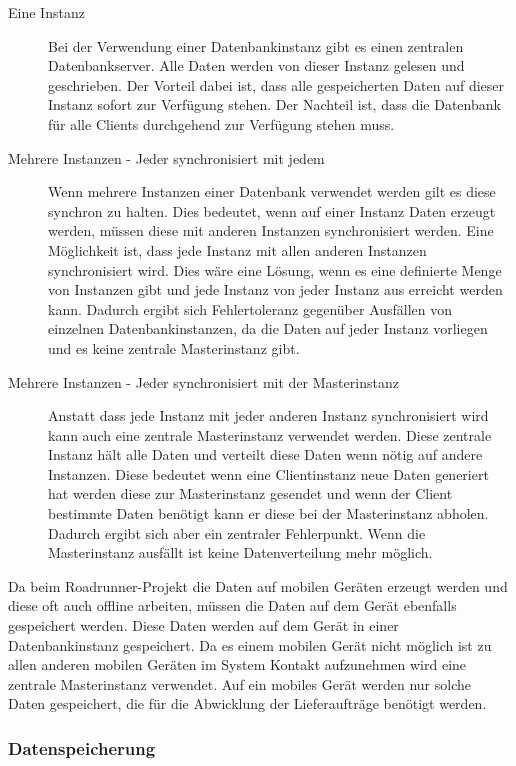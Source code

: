 \begin{appendix}
	\begin{description}
		\item[Eine Instanz] Bei der Verwendung einer Datenbankinstanz gibt es einen zentralen Datenbankserver. Alle Daten werden von dieser Instanz gelesen und geschrieben. Der Vorteil dabei ist, dass alle gespeicherten Daten auf dieser Instanz sofort zur Verfügung stehen. Der Nachteil ist, dass die Datenbank für alle Clients durchgehend zur Verfügung stehen muss.
		\item[Mehrere Instanzen - Jeder synchronisiert mit jedem] Wenn mehrere Instanzen einer Datenbank verwendet werden gilt es diese synchron zu halten. Dies bedeutet, wenn auf einer Instanz Daten erzeugt werden, müssen diese mit anderen Instanzen synchronisiert werden. Eine Möglichkeit ist, dass jede Instanz mit allen anderen Instanzen synchronisiert wird. Dies wäre eine Lösung, wenn es eine definierte Menge von Instanzen gibt und jede Instanz von jeder Instanz aus erreicht werden kann. Dadurch ergibt sich Fehlertoleranz gegenüber Ausfällen von einzelnen Datenbankinstanzen, da die Daten auf jeder Instanz vorliegen und es keine zentrale Masterinstanz gibt.
		\item [Mehrere Instanzen - Jeder synchronisiert mit der Masterinstanz] Anstatt dass jede Instanz mit jeder anderen Instanz synchronisiert wird kann auch eine zentrale Masterinstanz verwendet werden. Diese zentrale Instanz hält alle Daten und verteilt diese Daten wenn nötig auf andere Instanzen. Diese bedeutet wenn eine Clientinstanz neue Daten generiert hat werden diese zur Masterinstanz gesendet und wenn der Client bestimmte Daten benötigt kann er diese bei der Masterinstanz abholen. Dadurch ergibt sich aber ein zentraler Fehlerpunkt. Wenn die Masterinstanz ausfällt ist keine Datenverteilung mehr möglich. 
	\end{description}

	Da beim Roadrunner-Projekt die Daten auf mobilen Geräten erzeugt werden und diese oft auch offline arbeiten, müssen die Daten auf dem Gerät ebenfalls gespeichert werden. Diese Daten werden auf dem Gerät in einer Datenbankinstanz gespeichert. Da es einem mobilen Gerät nicht möglich ist zu allen anderen mobilen Geräten im System Kontakt aufzunehmen wird eine zentrale Masterinstanz verwendet. Auf ein mobiles Gerät werden nur solche Daten gespeichert, die für die Abwicklung der Lieferaufträge benötigt werden.

	\subsubsection{Datenspeicherung}


\end{appendix}
